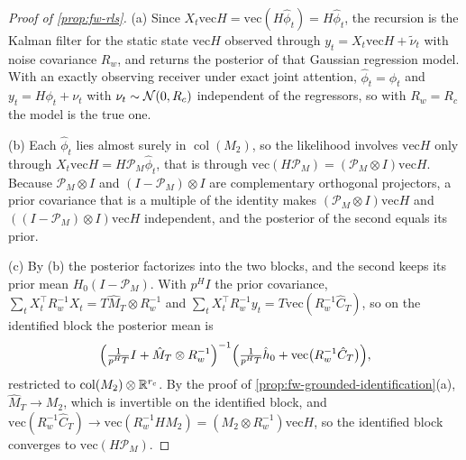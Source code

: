 \begin{proof}[Proof of \cref{prop:fw-rls}]
(a) Since $X_t\mathrm{vec}H=\mathrm{vec}(H\hat\phi_t)=H\hat\phi_t$, the recursion is the Kalman filter for the static state $\mathrm{vec}H$ observed through $y_t=X_t\mathrm{vec}H+\tilde\nu_t$ with noise covariance $R_w$, and returns the posterior of that Gaussian regression model. With an exactly observing receiver under exact joint attention, $\hat\phi_t=\phi_t$ and $y_t=H\phi_t+\nu_t$ with $\nu_t\sim\mathcal{N}(0,R_c)$ independent of the regressors, so with $R_w=R_c$ the model is the true one.

(b) Each $\hat\phi_t$ lies almost surely in $\operatorname{col}(M_2)$, so the likelihood involves $\mathrm{vec}H$ only through $X_t\mathrm{vec}H=H\mathcal P_M\hat\phi_t$, that is through $\mathrm{vec}(H\mathcal P_M)=(\mathcal P_M\otimes I)\mathrm{vec}H$. Because $\mathcal P_M\otimes I$ and $(I-\mathcal P_M)\otimes I$ are complementary orthogonal projectors, a prior covariance that is a multiple of the identity makes $(\mathcal P_M\otimes I)\mathrm{vec}H$ and $((I-\mathcal P_M)\otimes I)\mathrm{vec}H$ independent, and the posterior of the second equals its prior.

(c) By (b) the posterior factorizes into the two blocks, and the second keeps its prior mean $H_0(I-\mathcal P_M)$. With $p^HI$ the prior covariance, $\sum_tX_t^\top R_w^{-1}X_t=T\hat M_T\otimes R_w^{-1}$ and $\sum_tX_t^\top R_w^{-1}y_t=T\mathrm{vec}(R_w^{-1}\hat C_T)$, so on the identified block the posterior mean is
\[
\Bigl(\tfrac1{p^HT}I+\hat M_T\otimes R_w^{-1}\Bigr)^{-1}\Bigl(\tfrac1{p^HT}\hat h_0+\mathrm{vec}\bigl(R_w^{-1}\hat C_T\bigr)\Bigr),
\]
restricted to $\operatorname{col}(M_2)\otimes\mathbb{R}^{r_c}$. By the proof of \cref{prop:fw-grounded-identification}(a), $\hat M_T\to M_2$, which is invertible on the identified block, and $\mathrm{vec}(R_w^{-1}\hat C_T)\to\mathrm{vec}(R_w^{-1}HM_2)=(M_2\otimes R_w^{-1})\mathrm{vec}H$, so the identified block converges to $\mathrm{vec}(H\mathcal P_M)$.


\end{proof}
